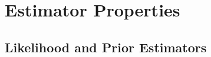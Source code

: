 \documentclass[10pt,journal,cspaper,compsoc]{IEEEtran}
\newcommand{\GG}{\mathbb{G}}
\newcommand{\EE}{\mathbb{E}}           %
\providecommand{\mc}[1]{\mathcal{#1}}
\providecommand{\mhc}[1]{\widehat{\mathcal{#1}}}
\begin{document}
% 




% 
% 
% 
% 
% 


\section{Estimator Properties} %
\label{sec:results}

% 

\subsection{Likelihood and Prior Estimators} %
\label{ssub:subsubsection_name4}
\end{document}

